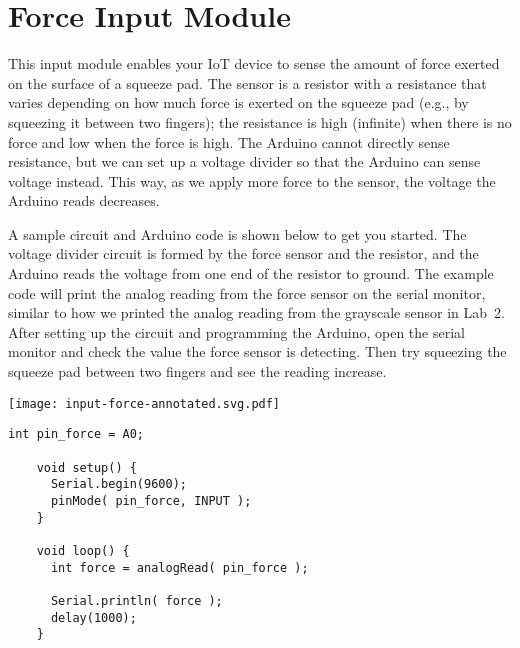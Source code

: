 
\clearpage
\section{Force Input Module}
\label{sec-input-force}

This input module enables your IoT device to sense the amount of force
exerted on the surface of a squeeze pad. The sensor is a resistor with a
resistance that varies depending on how much force is exerted on the
squeeze pad (e.g., by squeezing it between two fingers); the resistance
is high (infinite) when there is no force and low when the force is
high. The Arduino cannot directly sense resistance, but we can set up a
voltage divider so that the Arduino can sense voltage instead. This way,
as we apply more force to the sensor, the voltage the Arduino reads
decreases.


A sample circuit and Arduino code is shown below to get you started.
The voltage divider circuit is formed by the force sensor and the
 resistor, and the Arduino reads the voltage from one end
of the resistor to ground. The example code will print the analog
reading from the force sensor on the serial monitor, similar to how we
printed the analog reading from the grayscale sensor in Lab~2. After
setting up the circuit and programming the Arduino, open the serial
monitor and check the value the force sensor is detecting. Then try
squeezing the squeeze pad between two fingers and see the reading
increase.

\vspace{0.1in}
\begin{minipage}[t]{0.49\tw}
  \vspace{0pt}

  \texttt{[image: input-force-annotated.svg.pdf]}
\end{minipage}
\hfill
\begin{minipage}[t]{0.49\tw}
  \vspace{0.1in}
  \begin{Verbatim}[gobble=3,fontsize=\small]
    int pin_force = A0;

    void setup() {
      Serial.begin(9600);
      pinMode( pin_force, INPUT );
    }

    void loop() {
      int force = analogRead( pin_force );

      Serial.println( force );
      delay(1000);
    }
  \end{Verbatim}
\end{minipage}
\vspace{0.1in}

